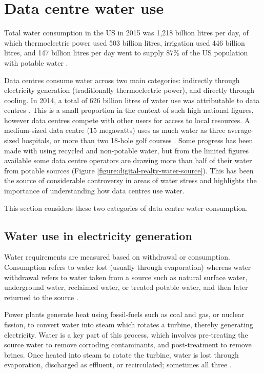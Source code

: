 \documentclass{article}
\begin{document}
\section*{Data centre water use}

Total water consumption in the US in 2015 was 1,218 billion litres per day, of
which thermoelectric power used 503 billion litres, irrigation used 446 billion
litres, and 147 billion litres per day went to supply 87\% of the US population
with potable water \cite{dieter_estimated_2018}.

Data centres consume water across two main categories: indirectly through
electricity generation (traditionally thermoelectric power), and directly
through cooling. In 2014, a total of 626 billion litres of water use was
attributable to data centres \cite{shehabi_united_2016}. This is a small
proportion in the context of such high national figures, however data centres
compete with other users for access to local resources. A medium-sized data
centre (15 megawatts) uses as much water as three average-sized hospitals, or
more than two 18-hole golf courses \cite{fitzgerald_data_2015}. Some progress
has been made with using recycled and non-potable water, but from the limited
figures available \cite{digital_realty_environmental_2019} some data centre
operators are drawing more than half of their water from potable sources
(Figure \ref{figure:digital-realty-water-source}). This has been the source of
considerable controversy in areas of water stress and highlights the importance
of understanding how data centres use water.

This section considers these two categories of data centre water consumption.

\subsection*{Water use in electricity generation}

Water requirements are measured based on withdrawal or consumption. Consumption
refers to water lost (usually through evaporation) whereas water withdrawal
refers to water taken from a source such as natural surface water, underground
water, reclaimed water, or treated potable water, and then later returned to
the source \cite{pan_cooling_2018}.

Power plants generate heat using fossil-fuels such as coal and gas, or nuclear
fission, to convert water into steam which rotates a turbine, thereby
generating electricity. Water is a key part of this process, which involves
pre-treating the source water to remove corroding contaminants, and
post-treatment to remove brines. Once heated into steam to rotate the turbine,
water is lost through evaporation, discharged as effluent, or recirculated;
sometimes all three \cite{pan_cooling_2018}.
\end{document}
